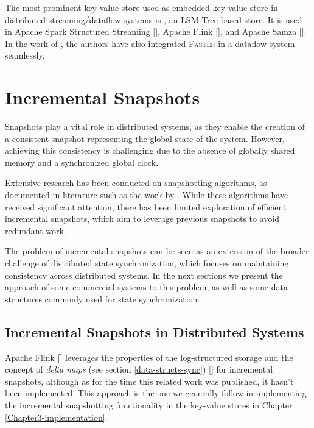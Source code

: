 The most prominent key-value store used as embedded key-value store in distributed streaming/dataflow systems is \cite{rocksdb}, an LSM-Tree-based store. It is used in Apache Spark Structured Streaming [\cite{spark-steaming}], Apache Flink [\cite{apache-flink}], \cite{kafka} and Apache Samza [\cite{samza}]. In the work of \cite{workload-aware-streaming-state-management}, the authors have also integrated \textsc{Faster} in a dataflow system seamlessly.

\section{Incremental Snapshots}

Snapshots play a vital role in distributed systems, as they enable the creation of a consistent snapshot representing the global state of the system. However, achieving this consistency is challenging due to the absence of globally shared memory and a synchronized global clock.

Extensive research has been conducted on snapshotting algorithms, as documented in literature such as the work by \cite{snapshots-rollbacks}. While these algorithms have received significant attention, there has been limited exploration of efficient incremental snapshots, which aim to leverage previous snapshots to avoid redundant work.

The problem of incremental snapshots can be seen as an extension of the broader challenge of distributed state synchronization, which focuses on maintaining consistency across distributed systems. In the next sections we present the approach of some commercial systems to this problem, as well as some data structures commonly used for state synchronization.

\subsection{Incremental Snapshots in Distributed Systems}

Apache Flink [\cite{apache-flink}] leverages the properties of the log-structured storage and the concept of \textit{delta maps} (see section \ref{data-structs-sync}) [\cite{state-management-apache-flink}] for incremental snapshots, although as for the time this related work was published, it hasn't been implemented. This approach is the one we generally follow in implementing the incremental snapshotting functionality in the key-value stores in Chapter \ref{Chapter3-implementation}.


